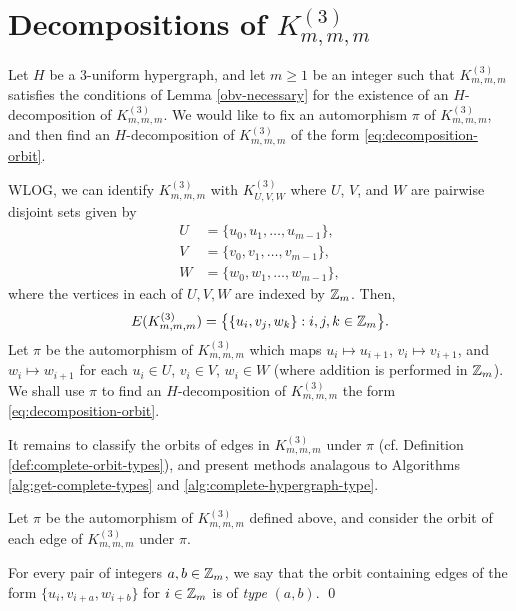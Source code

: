 \section{Decompositions of $K_{m,m,m}^{(3)}$}
\label{sec:methods/gdd}

Let $H$ be a $3$-uniform hypergraph, and let $m \geq 1$ be an integer such that $K_{m,m,m}^{(3)}$ satisfies the conditions of Lemma \ref{obv-necessary} for the existence of an $H$-decomposition of $K_{m,m,m}^{(3)}$. We would like to fix an automorphism $\pi$ of $K_{m,m,m}^{(3)}$, and then find an $H$-decomposition of $K_{m,m,m}^{(3)}$ of the form \eqref{eq:decomposition-orbit}.

WLOG, we can identify $K_{m,m,m}^{(3)}$ with $K_{U,V,W}^{(3)}$ where $U$, $V$, and $W$ are pairwise disjoint sets given by
\begin{align}
    U &= \{ u_0, u_1, \ldots, u_{m-1} \}, \nonumber \\
    V &= \{ v_0, v_1, \ldots, v_{m-1} \}, \nonumber \\
    W &= \{ w_0, w_1, \ldots, w_{m-1} \}, \nonumber
\end{align}
where the vertices in each of $U, V, W$ are indexed by $\mathbb{Z}_m$. Then,
\begin{equation} \label{eq:gdd-edges}
    E(K_{m,m,m}^{(3)}) = \big\{ \{u_i, v_j, w_k\} : i,j,k \in \mathbb{Z}_m \big\}.
\end{equation}
Let $\pi$ be the automorphism of $K_{m,m,m}^{(3)}$ which maps $u_i \mapsto u_{i+1}$, $v_i \mapsto v_{i+1}$, and $w_{i} \mapsto w_{i+1}$ for each $u_i \in U$, $v_i \in V$, $w_i \in W$ (where addition is performed in $\mathbb{Z}_m$).
We shall use $\pi$ to find an $H$-decomposition of $K_{m,m,m}^{(3)}$ the form \eqref{eq:decomposition-orbit}.

It remains to classify the orbits of edges in $K_{m,m,m}^{(3)}$ under $\pi$ (cf. Definition \ref{def:complete-orbit-types}), and present methods analagous to Algorithms \ref{alg:get-complete-types} and \ref{alg:complete-hypergraph-type}.

\begin{definition} \label{def:gdd-orbit-types}
Let $\pi$ be the automorphism of $K_{m,m,m}^{(3)}$ defined above, and consider the orbit of each edge of $K_{m,m,m}^{(3)}$ under $\pi$.

For every pair of integers $a, b \in \mathbb{Z}_m$, we say that the orbit containing edges of the form $\{u_i, v_{i+a}, w_{i+b}\}$ for $i \in \mathbb{Z}_m$ is of {\em type} $(a, b)$.
\qed
\end{definition}

